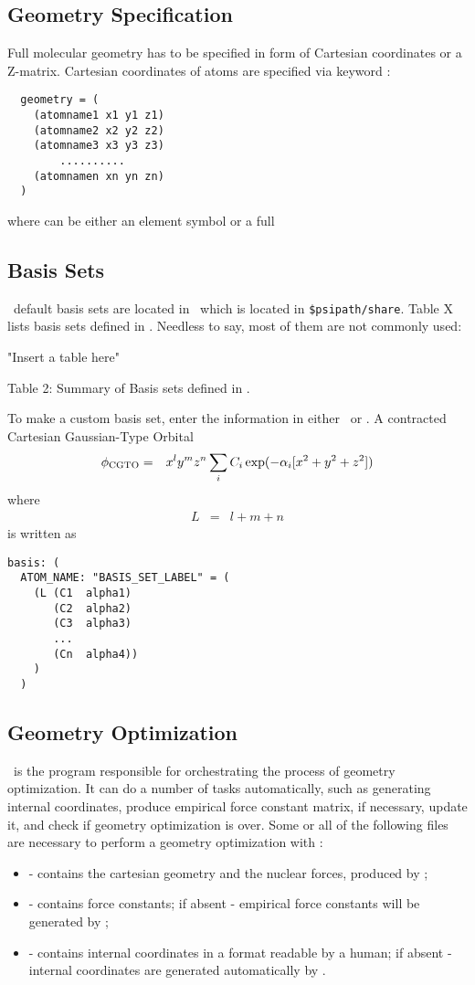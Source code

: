 \subsection{Geometry Specification}
Full molecular geometry has to be specified in form of Cartesian coordinates or
a Z-matrix. Cartesian coordinates of atoms are specified via keyword
:
\begin{verbatim}
  geometry = (
    (atomname1 x1 y1 z1)
    (atomname2 x2 y2 z2)
    (atomname3 x3 y3 z3)
        ..........
    (atomnamen xn yn zn)
  )
\end{verbatim}
where  can be either an element symbol or a full

\subsection{Basis Sets}
\PSIthree\ default basis sets are located in \pbasisdat\ which is located in
{\tt \$psipath/share}. Table X lists basis sets defined in \pbasisdat.
Needless to say, most of them are not commonly used:

"Insert a table here"

Table 2: Summary of Basis sets defined in \PSIthree.

To make a custom basis set, enter the information in either
\basisdat\ or . A contracted Cartesian Gaussian-Type Orbital
\begin{eqnarray}
\phi_{\rm CGTO} & = & x^ly^mz^n\sum_i C_i \exp(-\alpha_i[x^2+y^2+z^2])
\end{eqnarray}
where
\begin{eqnarray}
L & = & l+m+n
\end{eqnarray}
is written as
\begin{verbatim}
basis: (
  ATOM_NAME: "BASIS_SET_LABEL" = (
    (L (C1  alpha1)
       (C2  alpha2)
       (C3  alpha3)
       ...
       (Cn  alpha4))   
    )
  )
\end{verbatim}

\subsection{Geometry Optimization}
\PSIoptking\ is the program responsible for orchestrating the
process of geometry optimization. It can do a number of tasks
automatically, such as generating internal coordinates, produce
empirical force constant matrix, if necessary, update it, and
check if geometry optimization is over. Some or all of the following
files are necessary to perform a geometry optimization with \PSIoptking:
\begin{itemize} 
\item {} - contains the cartesian geometry and the nuclear forces, produced by \PSIcderiv ;
\item \fconstdat - contains force constants; if absent - empirical force constants will
be generated by \PSIoptking ;
\item \intcodat - contains internal coordinates in a format readable by a human;
if absent - internal coordinates are generated automatically by \PSIoptking .
\end{itemize}

